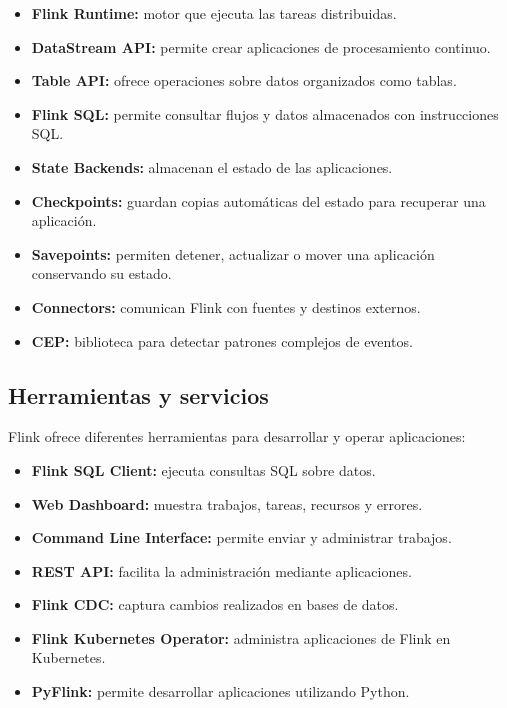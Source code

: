 \begin{itemize}
    \item \textbf{Flink Runtime:} motor que ejecuta las tareas distribuidas.
    
    \item \textbf{DataStream API:} permite crear aplicaciones de procesamiento
    continuo.
    
    \item \textbf{Table API:} ofrece operaciones sobre datos organizados como
    tablas.
    
    \item \textbf{Flink SQL:} permite consultar flujos y datos almacenados con
    instrucciones SQL.
    
    \item \textbf{State Backends:} almacenan el estado de las aplicaciones.
    
    \item \textbf{Checkpoints:} guardan copias automáticas del estado para
    recuperar una aplicación.
    
    \item \textbf{Savepoints:} permiten detener, actualizar o mover una
    aplicación conservando su estado.
    
    \item \textbf{Connectors:} comunican Flink con fuentes y destinos externos.
    
    \item \textbf{CEP:} biblioteca para detectar patrones complejos de eventos.
\end{itemize}

\subsection{Herramientas y servicios}

Flink ofrece diferentes herramientas para desarrollar y operar aplicaciones:

\begin{itemize}
    \item \textbf{Flink SQL Client:} ejecuta consultas SQL sobre datos.
    \item \textbf{Web Dashboard:} muestra trabajos, tareas, recursos y errores.
    \item \textbf{Command Line Interface:} permite enviar y administrar trabajos.
    \item \textbf{REST API:} facilita la administración mediante aplicaciones.
    \item \textbf{Flink CDC:} captura cambios realizados en bases de datos.
    \item \textbf{Flink Kubernetes Operator:} administra aplicaciones de Flink
    en Kubernetes.
    \item \textbf{PyFlink:} permite desarrollar aplicaciones utilizando Python.
\end{itemize}

